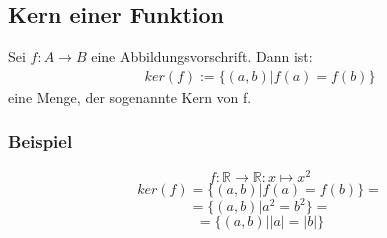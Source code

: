 \subsection{Kern einer Funktion}
Sei $f:{A}\longrightarrow{B}$ eine Abbildungsvorschrift.
Dann ist:
\begin{align*}
   ker(f) := \{(a,b) | f(a)=f(b)\}
\end{align*}
eine Menge, der sogenannte Kern von f.
\subsubsection{Beispiel}
$$ f: \mathbb{R} \rightarrow \mathbb{R} : {x}\longmapsto{x^2} $$
$$ ker(f)= \{(a,b) | f(a)=f(b) \} = $$
$$ = \{ (a,b) | a^2 = b^2 \} = $$
$$ = \{ (a,b) | |a| =|b| \} $$